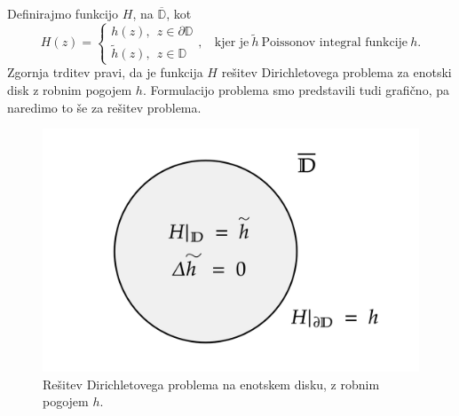 \documentclass[mat1, tisk]{fmfdelo}
\begin{document}
    \begin{opomba}
        \label{opomba_obstoj}
        Definirajmo funkcijo $H$, na $\overline{\mathbb{D}}$, kot
        $$
            H(z) = \begin{cases}
                    h(z),~~z \in \partial \mathbb{D}\\
                    \widetilde{h}(z),~~z \in \mathbb{D}
            \end{cases},~~~~\text{kjer je}~\widetilde{h}~\text{Poissonov integral funkcije}~h.
        $$
        Zgornja trditev pravi, da je funkcija $H$ rešitev Dirichletovega problema za enotski disk z robnim pogojem $h$. 
        Formulacijo problema smo predstavili tudi grafično, pa naredimo to še za rešitev problema. 
        \begin{figure}[H]
            \begin{center}
                \includegraphics[width = \textwidth]{dirichlet_resitev.png}
                \caption{Rešitev Dirichletovega problema na enotskem disku, z robnim pogojem $h$.}
            \end{center}    
        \end{figure}
     \end{opomba}
\end{document}
